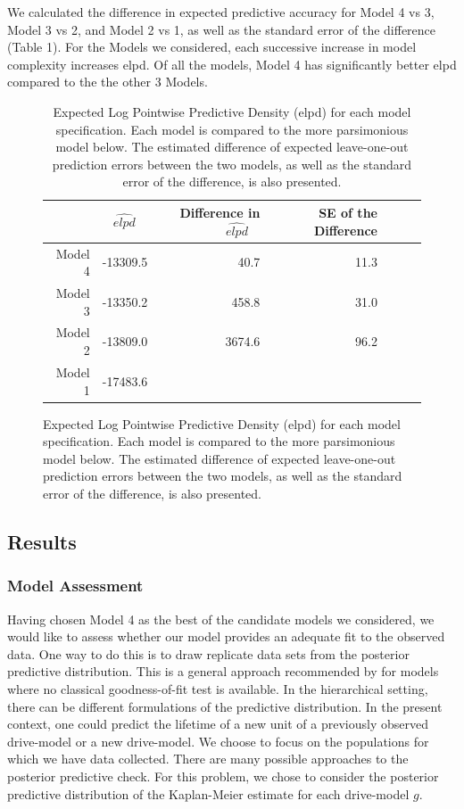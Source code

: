 \documentclass[12pt]{article}
\begin{document}
 We calculated the difference in expected predictive accuracy for Model 4 vs 3, Model 3 vs 2, and Model 2 vs 1, as well as the standard error of the difference (Table 1).  
For the Models we considered, each successive increase in model complexity increases elpd.  Of all the models, Model 4 has significantly better elpd compared to the the other 3 Models.
\begin{figure}
\begin{table}[H]
\centering
\begin{tabular}{rrrrrrr}
  \hline
 & $\widehat{elpd}$ \ & Difference in $\widehat{elpd}$ \ & SE of the Difference \\ 
  \hline
Model 4 & -13309.5 & 40.7 & 11.3 \\ 
Model 3 & -13350.2 & 458.8 & 31.0  \\ 
Model 2 & -13809.0 & 3674.6 & 96.2 \\ 
Model 1 & -17483.6  \\ 
   \hline
\end{tabular}
\caption{Expected Log Pointwise Predictive Density (elpd) for each model specification.  Each model is compared to the more parsimonious model below.  The estimated difference of expected leave-one-out prediction errors between the two models, as well as the standard error of the difference, is also presented.}
\label{table:1}
\end{table}
\end{figure}
\subsection{Results}
\subsubsection{Model Assessment}
Having chosen Model 4 as the best of the candidate models we considered, we would like to assess whether our model provides an adequate fit to the observed data. One way to do this is to draw replicate data sets from the posterior predictive distribution. This is a general approach recommended by \citet{gelman1996postpred} for models where no classical goodness-of-fit test is available. In the hierarchical setting, there can be different formulations of the predictive distribution. In the present context, one could predict the lifetime of a new unit of a previously observed drive-model or a new drive-model. We choose to focus on the populations for which we have data collected.
There are many possible approaches to the posterior predictive check. For this problem, we chose to consider the posterior predictive distribution of the Kaplan-Meier estimate for each drive-model $g$.
\end{document}

